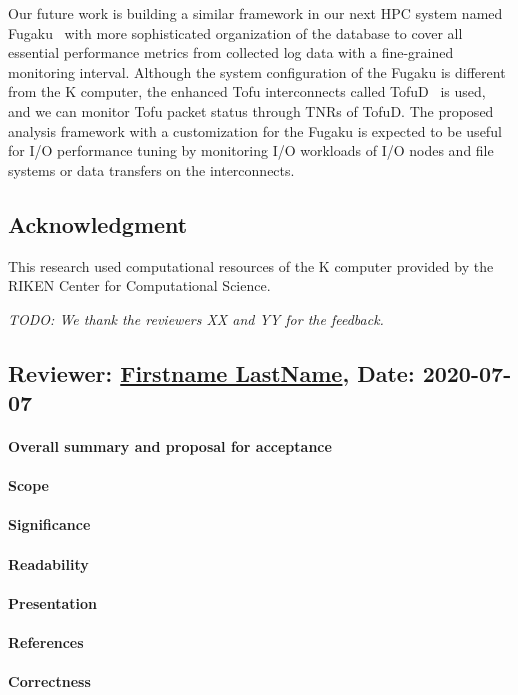 \documentclass{jhps}
\begin{document}
Our future work is building a similar framework in our next HPC system
named Fugaku~\cite{fugaku_info:web} with more sophisticated organization
of the database to cover all essential performance metrics
from collected log data with a fine-grained monitoring interval.
Although the system configuration of the Fugaku is different from the K computer,
the enhanced Tofu interconnects called TofuD~\cite{tofuD:cluster2018}
is used, and we can monitor Tofu packet status through TNRs of TofuD.
The proposed analysis framework with a customization for the Fugaku
is expected to be useful for I/O performance tuning by monitoring I/O workloads
of I/O nodes and file systems or data transfers on the interconnects.

\subsection*{Acknowledgment}

This research used computational resources of the K computer
provided by the RIKEN Center for Computational Science.

\textit{TODO: We thank the reviewers XX and YY for the feedback.}



\reviews   %

\subsection*{Reviewer: \href{Optional URL to reviewer page}{Firstname LastName}, Date: 2020-07-07}

\paragraph{Overall summary and proposal for acceptance}

\paragraph{Scope}   %

\paragraph{Significance}   %

\paragraph{Readability}   %

\paragraph{Presentation}

\paragraph{References}   %

\paragraph{Correctness}   %
\end{document}
